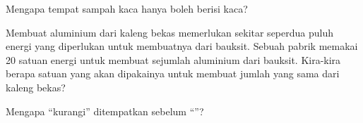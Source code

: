 \begin{exercise}[$\star$]\label{exo:g5:raw-materials-and-recycling:9}
Mengapa tempat sampah kaca hanya boleh berisi kaca?
\end{exercise}

\begin{exercise}[$\star\star$]\label{exo:g5:raw-materials-and-recycling:10}
Membuat aluminium dari kaleng bekas memerlukan sekitar seperdua puluh
energi yang diperlukan untuk membuatnya dari bauksit. Sebuah pabrik
memakai 20 satuan energi untuk membuat sejumlah aluminium dari
bauksit. Kira-kira berapa satuan yang akan dipakainya untuk membuat
jumlah yang sama dari kaleng bekas?
\end{exercise}

\begin{exercise}[$\star\star$]\label{exo:g5:raw-materials-and-recycling:11}
Mengapa ``kurangi'' ditempatkan sebelum ``''?
\end{exercise}
